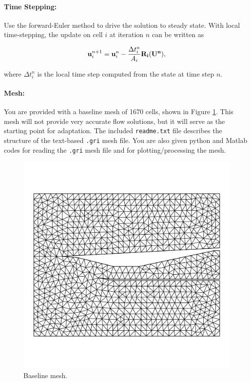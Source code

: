 \paragraph{Time Stepping:} Use the forward-Euler method to drive the solution to steady state. With local
time-stepping, the update on cell $i$ at iteration $n$ can be written as

\begin{equation}\label{eqn:forward_euler}
    {\bf u}_i^{n+1} = {\bf u}_i^n - \frac{\Delta t_i^n}{A_i}{\bf R_i(U^n)},
\end{equation}

where $\Delta t^n_i$ is the local time step computed from the state at time step $n$.

\pagebreak
\paragraph{Mesh:} You are provided with a baseline mesh of 1670 cells, shown in Figure \ref{fig:baseline_mesh}. This mesh will not provide very accurate flow solutions, but it will serve as the starting point for adaptation. The included {\texttt{readme.txt}} file describes the structure of the text-based {\texttt{.gri}} mesh file. You are also given python and Matlab codes for reading the {\texttt{.gri}} mesh file and for plotting/processing the mesh.

\begin{figure}[h]
    \centering
    \includegraphics[width = 0.75\linewidth]{admin/baseline_mesh.pdf}
    \caption[Baseline Mesh]{Baseline mesh.}
    \label{fig:baseline_mesh}
\end{figure}

